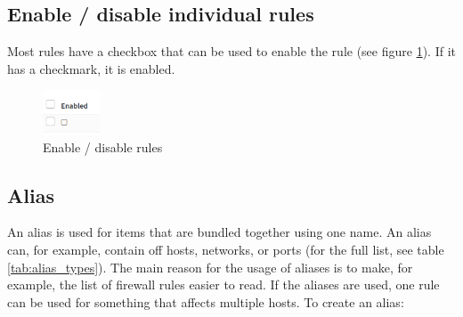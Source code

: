 \subsection{Enable / disable individual rules}
Most rules have a checkbox that can be used to enable the rule (see figure \ref{opensense:admin_enable}). If it has a checkmark, it is enabled.

\begin{figure}[h!]
    \centering
    \includegraphics[width=0.15\textwidth]{Images/admin/enable.PNG}
    \caption{Enable / disable rules}
    \label{opensense:admin_enable}
\end{figure}

\subsection{Alias}
An alias is used for items that are bundled together using one name. An alias can, for example, contain off hosts, networks, or ports (for the full list, see table \ref{tab:alias_types}). The main reason for the usage of aliases is to make, for example, the list of firewall rules easier to read. If the aliases are used, one rule can be used for something that affects multiple hosts. To create an alias:



